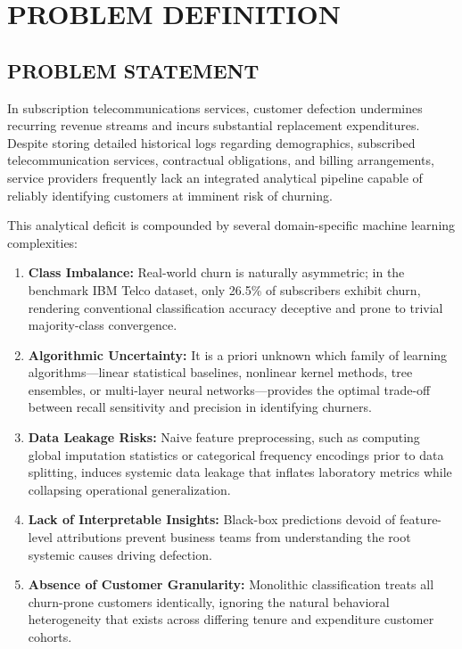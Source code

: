 \documentclass[12pt,a4paper]{report}
\newcommand{\datasetChurnProportion}{26.5\%}
\begin{document}
\chapter{PROBLEM DEFINITION}

\section{PROBLEM STATEMENT}
In subscription telecommunications services, customer defection undermines recurring revenue streams and incurs substantial replacement expenditures. Despite storing detailed historical logs regarding demographics, subscribed telecommunication services, contractual obligations, and billing arrangements, service providers frequently lack an integrated analytical pipeline capable of reliably identifying customers at imminent risk of churning. 

This analytical deficit is compounded by several domain-specific machine learning complexities:
\begin{enumerate}
    \item \textbf{Class Imbalance:} Real-world churn is naturally asymmetric; in the benchmark IBM Telco dataset, only \datasetChurnProportion{} of subscribers exhibit churn, rendering conventional classification accuracy deceptive and prone to trivial majority-class convergence.
    \item \textbf{Algorithmic Uncertainty:} It is a priori unknown which family of learning algorithms---linear statistical baselines, nonlinear kernel methods, tree ensembles, or multi-layer neural networks---provides the optimal trade-off between recall sensitivity and precision in identifying churners.
    \item \textbf{Data Leakage Risks:} Naive feature preprocessing, such as computing global imputation statistics or categorical frequency encodings prior to data splitting, induces systemic data leakage that inflates laboratory metrics while collapsing operational generalization.
    \item \textbf{Lack of Interpretable Insights:} Black-box predictions devoid of feature-level attributions prevent business teams from understanding the root systemic causes driving defection.
    \item \textbf{Absence of Customer Granularity:} Monolithic classification treats all churn-prone customers identically, ignoring the natural behavioral heterogeneity that exists across differing tenure and expenditure customer cohorts.
\end{enumerate}
\end{document}
